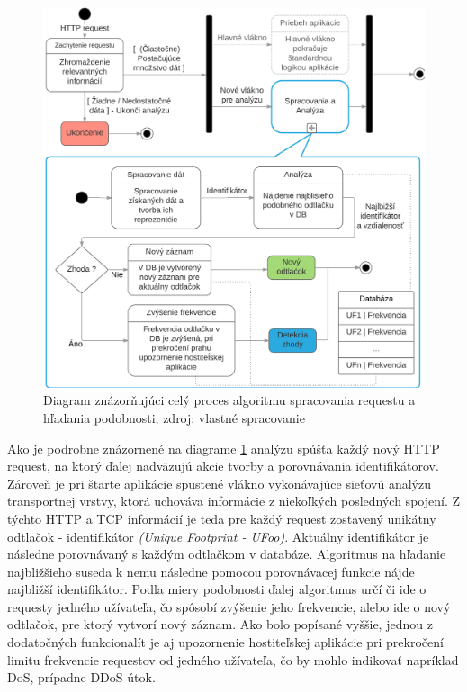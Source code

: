 \documentclass[
  digital, %
  table,   %
  lof,     %
  nolot,   %
  nocover
]{fithesis3}
\begin{document}
\begin{figure}[h]
  \centering
    \includegraphics[width=.93\textwidth]{images/footprint-hl.png}
  \caption{Diagram znázorňujúci celý proces algoritmu spracovania requestu a
  hľadania podobnosti, zdroj: vlastné spracovanie}
  \label{fig:footprint-hl}
\end{figure}

Ako je podrobne znázornené na diagrame \ref{fig:footprint-hl} analýzu spúšťa každý nový
HTTP request, na ktorý ďalej nadväzujú akcie tvorby a porovnávania
identifikátorov. Zároveň je pri štarte aplikácie spustené vlákno vykonávajúce
sieťovú analýzu transportnej vrstvy, ktorá uchováva informácie z niekoľkých
posledných spojení. Z týchto HTTP a TCP informácií je teda pre každý request
zostavený unikátny odtlačok - identifikátor \textit{(Unique Footprint - UFoo)}.
Aktuálny identifikátor je následne porovnávaný s každým odtlačkom v databáze.
Algoritmus na hľadanie najbližšieho suseda k nemu následne pomocou porovnávacej
funkcie nájde najbližší identifikátor. Podľa miery podobnosti ďalej
algoritmus určí či ide o requesty jedného užívateľa, čo spôsobí zvýšenie jeho
frekvencie, alebo ide o nový odtlačok, pre ktorý vytvorí nový záznam.
Ako bolo popísané vyššie, jednou z dodatočných funkcionalít je aj upozornenie hostiteľskej aplikácie pri
prekročení limitu frekvencie requestov od jedného užívateľa, čo by mohlo
indikovať napríklad DoS, prípadne DDoS útok.
\end{document}
